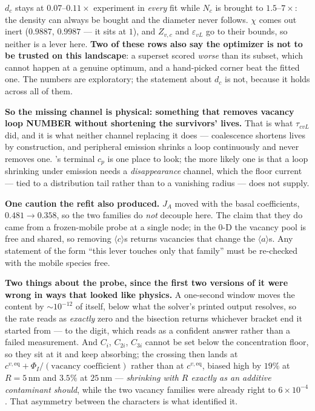 \documentclass{article}
\newcommand{\aloop}{\ensuremath{\langle a\rangle}}
\newcommand{\cloop}{\ensuremath{\langle c\rangle}}
\begin{document}
$d_c$ stays at $0.07$--$0.11\times$ experiment in \emph{every} fit while $N_c$ is
brought to $1.5$--$7\times$: the density can always be bought and the diameter
never follows. $\chi$ comes out inert ($0.9887$, $0.9987$ --- it sits at $1$),
and $Z_{v,c}$ and $\varepsilon_{vL}$ go to their bounds, so neither is a lever
here. \textbf{Two of these rows also say the optimizer is not to be trusted on
this landscape}: a superset scored \emph{worse} than its subset, which cannot
happen at a genuine optimum, and a hand-picked corner beat the fitted one. The
numbers are exploratory; the statement about $d_c$ is not, because it holds
across all of them.

\textbf{So the missing channel is physical: something that removes vacancy loop
NUMBER without shortening the survivors' lives.} That is what $\tau_{cvL}$ did,
and it is what neither channel replacing it does --- coalescence shortens lives
by construction, and peripheral emission shrinks a loop continuously and never
removes one. 's terminal $c_p$ is one place to look; the more
likely one is that a loop shrinking under emission needs a \emph{disappearance}
channel, which the floor current --- tied to a distribution tail rather than to
a vanishing radius --- does not supply.

\textbf{One caution the refit also produced.} $J_A$ moved with the basal
coefficients, $0.481\to0.358$, so the two families do \emph{not} decouple here.
The claim that they do came from a frozen-mobile probe at a single node; in the
$0$-D the vacancy pool is free and shared, so removing \cloop{}s returns
vacancies that change the \aloop{}s. Any statement of the form ``this lever
touches only that family'' must be re-checked with the mobile species free.

\textbf{Two things about the probe, since the first two versions of it were
wrong in ways that looked like physics.} A one-second window moves the content
by $\sim10^{-12}$ of itself, below what the solver's printed output resolves, so
the rate reads as \emph{exactly} zero and the bisection returns whichever
bracket end it started from --- to the digit, which reads as a confident answer
rather than a failed measurement. And $C_i$, $C_{2i}$, $C_{3i}$ cannot be set
below the concentration floor, so they sit at it and keep absorbing; the crossing
then lands at $c^{v,\mathrm{eq}}+\Phi_I/(\text{vacancy coefficient})$ rather than
at $c^{v,\mathrm{eq}}$, biased high by $19\%$ at $R=5\,$nm and $3.5\%$ at
$25\,$nm --- \emph{shrinking with $R$ exactly as an additive contaminant should},
while the two vacancy families were already right to $6\times10^{-4}$. That
asymmetry between the characters is what identified it.
\end{document}
